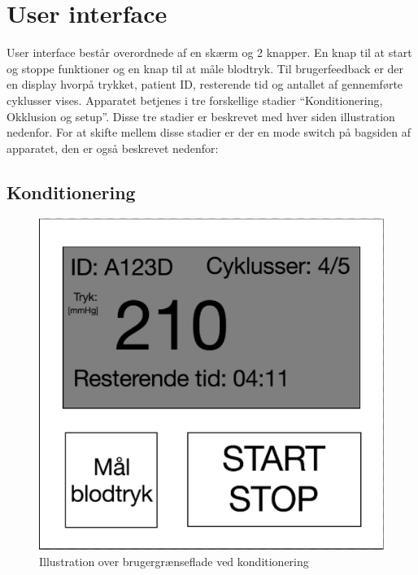\chapter{User interface}
User interface består overordnede af en skærm og 2 knapper. En knap til at start og stoppe funktioner og en knap til at måle blodtryk. Til brugerfeedback er der en display hvorpå trykket, patient ID, resterende tid og antallet af gennemførte cyklusser vises. Apparatet betjenes i tre forskellige stadier “Konditionering, Okklusion og setup”. Disse tre stadier er beskrevet med hver siden illustration nedenfor. For at skifte mellem disse stadier er der en mode switch på bagsiden af apparatet, den er også beskrevet nedenfor: 

\section{Konditionering}
\begin{figure}[H]
	\includegraphics[width=\textwidth]{Kravspecifikation/Illustrationer/KonditioneringGUI}
	\caption{Illustration over brugergrænseflade ved konditionering}
\end{figure}

